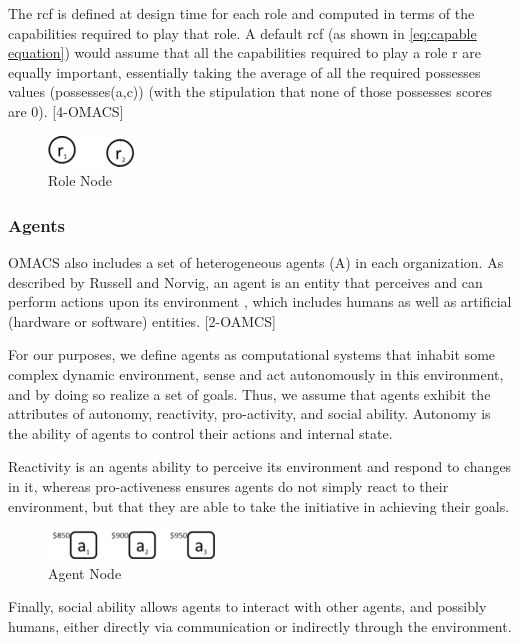 The rcf is defined at design time for each role and computed in terms of 
the capabilities required to play that role.
A default rcf (as shown in \ref{eq:capable equation}) 
would assume that all the capabilities required to play a role r are equally important,
essentially taking the average of all the required possesses values (possesses(a,c))
(with the stipulation that none of those possesses scores are 0). [4-OMACS]

\begin{figure}[th]
	\centering
		\includegraphics{chapiter1/img/Role}
	\caption{\label{fig:Role Node}Role Node }
\end{figure}

\subsubsection{ Agents}

OMACS also includes a set of heterogeneous agents (A) in each organization. 
As described by Russell and Norvig, an agent is an entity that perceives and can perform actions upon its
environment  , which includes humans as well as artificial (hardware or software) entities. [2-OAMCS]

For our purposes, we define agents as computational systems that inhabit some complex dynamic
environment, sense and act autonomously in this environment, and by doing so realize a set of
goals. Thus, we assume that agents exhibit the attributes of autonomy, reactivity, pro-activity, and
social ability. Autonomy is the ability of agents to control their actions and internal state.


Reactivity is an agents ability to perceive its environment and respond to changes in it, whereas
pro-activeness ensures agents do not simply react to their environment, but that they are able to
take the initiative in achieving their goals. 


\begin{figure}[th]
	\centering
		\includegraphics{chapiter1/img/Agent}
	\caption{\label{fig:Agent Node}Agent Node }
\end{figure}



Finally, social ability allows agents to interact with
other agents, and possibly humans, either directly via communication or indirectly through the
environment.

